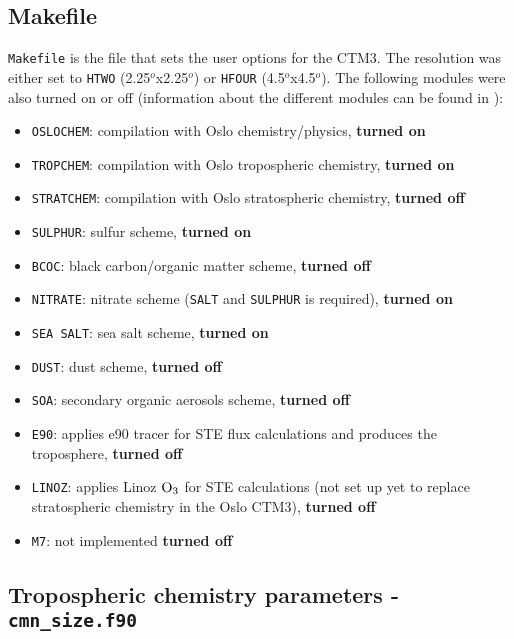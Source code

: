 \subsection{Makefile}\label{subsubsec:makefile}

\texttt{Makefile} is the file that sets the user options for the CTM3. The resolution was either set to \texttt{HTWO} (2.25$^o$x2.25$^o$) or \texttt{HFOUR} (4.5$^o$x4.5$^o$). The following modules were also turned on or off (information about the different modules can be found in \cite{SovdeManual}):

\begin{itemize}
    \item \texttt{OSLOCHEM}: compilation with Oslo chemistry/physics, \textbf{turned on}
    \item \texttt{TROPCHEM}: compilation with Oslo tropospheric chemistry, \textbf{turned on}
    \item \texttt{STRATCHEM}: compilation with Oslo stratospheric chemistry, \textbf{turned off}
    \item \texttt{SULPHUR}: sulfur scheme, \textbf{turned on}
    \item \texttt{BCOC}: black carbon/organic matter scheme, \textbf{turned off}
    \item \texttt{NITRATE}: nitrate scheme (\texttt{SALT} and \texttt{SULPHUR} is required), \textbf{turned on}
    \item \texttt{SEA SALT}: sea salt scheme, \textbf{turned on}
    \item \texttt{DUST}: dust scheme, \textbf{turned off}
    \item \texttt{SOA}: secondary organic aerosols scheme, \textbf{turned off}
    \item \texttt{E90}: applies e90 tracer for STE flux calculations and produces the troposphere, \textbf{turned off}
    \item \texttt{LINOZ}: applies Linoz $\mathrm{O_3}$ for STE calculations (not set up yet to replace stratospheric chemistry in the Oslo CTM3), \textbf{turned off}
    \item \texttt{M7}: not implemented \textbf{turned off}
\end{itemize}


\subsection{Tropospheric chemistry parameters - \texttt{cmn\_size.f90}}\label{subsubsec:cmn_size}


